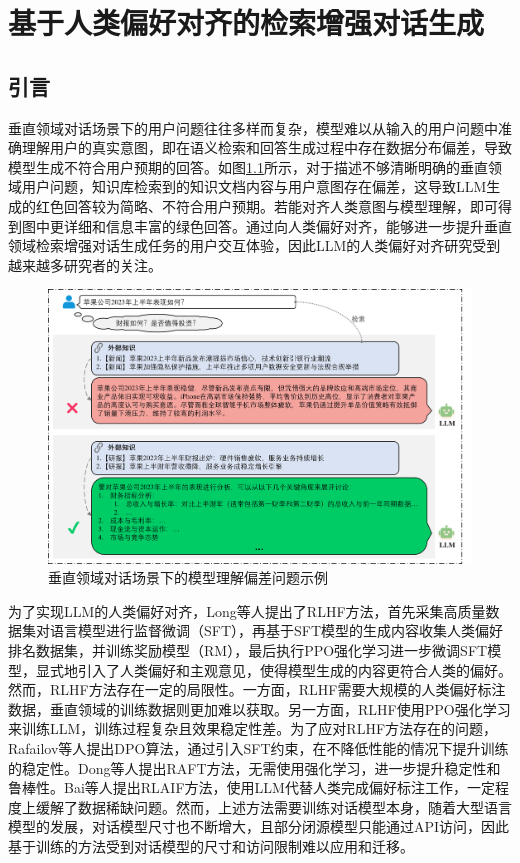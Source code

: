 \chapter{基于人类偏好对齐的检索增强对话生成}
\section{引言}

垂直领域对话场景下的用户问题往往多样而复杂，模型难以从输入的用户问题中准确理解用户的真实意图，即在语义检索和回答生成过程中存在数据分布偏差，导致模型生成不符合用户预期的回答。如图\ref{alignment_problem_show_case}所示，对于描述不够清晰明确的垂直领域用户问题，知识库检索到的知识文档内容与用户意图存在偏差，这导致LLM生成的红色回答较为简略、不符合用户预期。若能对齐人类意图与模型理解，即可得到图中更详细和信息丰富的绿色回答。通过向人类偏好对齐，能够进一步提升垂直领域检索增强对话生成任务的用户交互体验，因此LLM的人类偏好对齐研究受到越来越多研究者的关注。

\begin{figure}[htbp]
	\centering
	\includegraphics[scale=0.45]{Fig/alignment_problem_show_case.png}
	\caption{\label{alignment_problem_show_case}垂直领域对话场景下的模型理解偏差问题示例}
\end{figure}

为了实现LLM的人类偏好对齐，Long等人\cite{DBLP:conf/nips/Ouyang0JAWMZASR22}提出了RLHF方法，首先采集高质量数据集对语言模型进行监督微调（SFT），再基于SFT模型的生成内容收集人类偏好排名数据集，并训练奖励模型（RM），最后执行PPO强化学习进一步微调SFT模型，显式地引入了人类偏好和主观意见，使得模型生成的内容更符合人类的偏好。然而，RLHF方法存在一定的局限性。一方面，RLHF需要大规模的人类偏好标注数据，垂直领域的训练数据则更加难以获取。另一方面，RLHF使用PPO强化学习来训练LLM，训练过程复杂且效果稳定性差。为了应对RLHF方法存在的问题，Rafailov等人\cite{DBLP:conf/nips/RafailovSMMEF23}提出DPO算法，通过引入SFT约束，在不降低性能的情况下提升训练的稳定性。Dong等人\cite{DBLP:journals/corr/abs-2304-06767}提出RAFT方法，无需使用强化学习，进一步提升稳定性和鲁棒性。Bai等人\cite{DBLP:journals/corr/abs-2212-08073}提出RLAIF方法，使用LLM代替人类完成偏好标注工作，一定程度上缓解了数据稀缺问题。然而，上述方法需要训练对话模型本身，随着大型语言模型的发展，对话模型尺寸也不断增大，且部分闭源模型只能通过API访问，因此基于训练的方法受到对话模型的尺寸和访问限制难以应用和迁移。

